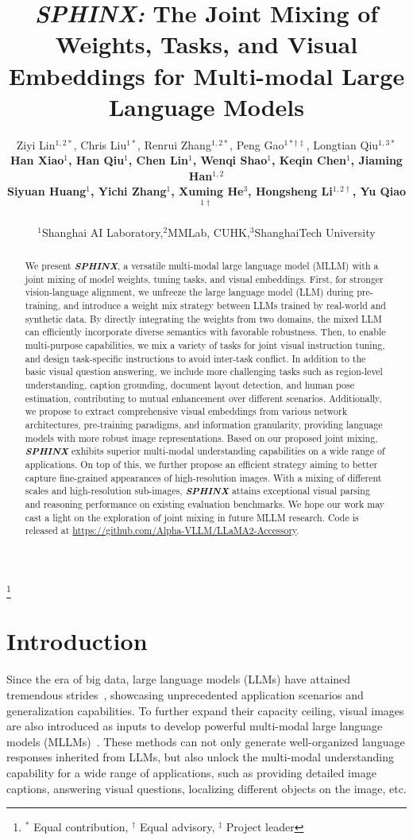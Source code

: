 \documentclass{article} \usepackage{iclr2024_conference,times}
\title{\textcolor{Goldenrod3}{\textit{\textbf{SPHINX:}}} The Joint Mixing of Weights, Tasks, and Visual Embeddings for Multi-modal Large Language Models}
\author{Ziyi Lin$^{1,2*}$, Chris Liu$^{1*}$, Renrui Zhang$^{1,2*}$, Peng Gao$^{1*\dagger\ddagger}$, Longtian Qiu$^{1,3*}$\vspace{0.1cm}\\
{\bf Han Xiao$^1$, Han Qiu$^1$, Chen Lin$^1$, Wenqi Shao$^1$, Keqin Chen$^1$, Jiaming Han$^{1,2}$}\vspace{0.1cm}\\
{\bf Siyuan Huang$^1$, Yichi Zhang$^1$, Xuming He$^3$, Hongsheng Li$^{1,2\dagger}$, Yu Qiao$^{1\dagger}$}\vspace{0.1cm}
\\ \\
$^1$Shanghai AI Laboratory,\quad $^2$MMLab, CUHK,\quad $^3$ShanghaiTech University
}
\newcommand\blfootnote[1]{\begingroup
  \renewcommand\thefootnote{}\footnote{#1}\addtocounter{footnote}{-1}\endgroup
}
\begin{document}
\maketitle
\blfootnote{$^*$ Equal contribution, $^\dagger$ Equal advisory, $^\ddagger$ Project leader}

\begin{abstract}
We present \textcolor{Goldenrod3}{\textbf{\textit{SPHINX}}}, a versatile multi-modal large language model (MLLM) with a joint mixing of model weights, tuning tasks, and visual embeddings. 
First, for stronger vision-language alignment, we unfreeze the large language model (LLM) during pre-training, and introduce a weight mix strategy between LLMs trained by real-world and synthetic data. By directly integrating the weights from two domains, the mixed LLM can efficiently incorporate diverse semantics with favorable robustness.
Then, to enable multi-purpose capabilities, we mix a variety of tasks for joint visual instruction tuning, and design task-specific instructions to avoid inter-task conflict. In addition to the basic visual question answering, we include more challenging tasks such as region-level understanding, caption grounding, document layout detection, and human pose estimation, contributing to mutual enhancement over different scenarios. 
Additionally, we propose to extract comprehensive visual embeddings from various network architectures, pre-training paradigms, and information granularity, providing language models with more robust image representations.
Based on our proposed joint mixing, \textcolor{Goldenrod3}{\textbf{\textit{SPHINX}}} exhibits superior multi-modal understanding capabilities on a wide range of applications.
On top of this, we further propose an efficient strategy aiming to better capture fine-grained appearances of high-resolution images. With a mixing of different scales and high-resolution sub-images, \textcolor{Goldenrod3}{\textbf{\textit{SPHINX}}} attains exceptional visual parsing and reasoning performance on existing evaluation benchmarks. 
We hope our work may cast a light on the exploration of joint mixing in future MLLM research. Code is released at \url{https://github.com/Alpha-VLLM/LLaMA2-Accessory}.
\end{abstract}


\section{Introduction}
Since the era of big data, large language models (LLMs) have attained tremendous strides~\citep{OpenAI2023ChatGPT,OpenAI2023GPT4TR,brown2020language,touvron2023llama,zhang2022opt}, showcasing unprecedented application scenarios and generalization capabilities. To further expand their capacity ceiling, visual images are also introduced as inputs to develop powerful multi-modal large language models (MLLMs)~\citep{zhang2023llama,li2023blip,llava,zhu2023minigpt,zhao2023mmicl}. These methods can not only generate well-organized language responses inherited from LLMs, but also unlock the multi-modal understanding capability for a wide range of applications, such as providing detailed image captions, answering visual questions, localizing different objects on the image, etc.
\end{document}
